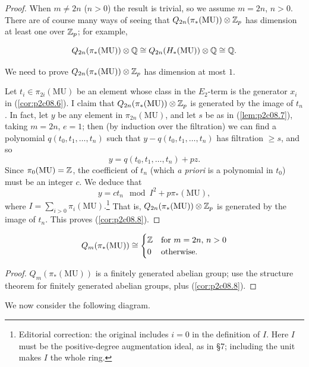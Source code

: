 \documentclass[../main]{subfiles}
\begin{document}
\begin{proof}
When $m \ne 2n$ ($n > 0$) the result is trivial, so we assume $m = 2n$, $n > 0$. There are of course many ways of seeing that $Q_{2n}(\pi_\ast(\mathrm{MU})) \otimes \mathbb{Z}_p$ has dimension at least one over $\mathbb{Z}_p$; for example, 

\[Q_{2n}(\pi_\ast(\mathrm{MU})) \otimes \mathbb{Q} \cong Q_{2n}(H_\ast(\mathrm{MU})) \otimes \mathbb{Q} \cong \mathbb{Q}.\]

We need to prove $Q_{2n}(\pi_\ast(\mathrm{MU})) \otimes \mathbb{Z}_p$ has dimension at most $1$.

Let $t_i \in \pi_{2i}(\mathrm{MU})$ be an element whose class in the $E_2$-term is the generator $x_i$ in (\ref{cor:p2c08.6}). I claim that $Q_{2n}(\pi_\ast(\mathrm {MU})) \otimes \mathbb{Z}_p$ is generated by the image of $t_n$. In fact, let $y$ be any element in $\pi_{2n}(\mathrm {MU})$, and let $s$ be as in (\ref{lem:p2c08.7}), taking $m = 2n$, $e = 1$; then (by induction over the filtration) we can find a polynomial $q(t_0, t_1, \ldots, t_n)$ such that $y - q(t_0, t_1, \ldots, t_n)$ has filtration $\ge s$, and so \[y = q(t_0, t_1, \ldots, t_n) + p z.\] Since $\pi_0(\mathrm{MU}) = \mathbb{Z}$, the coefficient of $t_n$ (which \emph{a priori} is a polynomial in $t_0$) must be an integer $c$. We deduce that \[y = c t_n \mod I^2 + p \pi_\ast(\mathrm{MU}),\] where $\displaystyle I = \sum_{i > 0} \pi_i(\mathrm{MU}).$\footnote{Editorial correction: the original includes $i=0$ in the definition of $I$. Here $I$ must be the positive-degree augmentation ideal, as in \S7; including the unit makes $I$ the whole ring.} That is, $Q_{2n}(\pi_\ast(\mathrm{MU})) \otimes \mathbb{Z}_p$ is generated by the image of $t_n$. This proves (\ref{cor:p2c08.8}).
\end{proof}

\begin{corollary}
\label{cor:p2c08.9}
\[Q_m(\pi_\ast(\mathrm{MU})) \cong \begin{cases}\mathbb{Z} & \text {for } m = 2n, \, n > 0 \\ 0 & \text{otherwise.}\end{cases}\]
\end{corollary}

\begin{proof}
$Q_m(\pi_\ast(\mathrm{MU}))$ is a finitely generated abelian group; use the structure theorem for finitely generated abelian groups, plus (\ref{cor:p2c08.8}).
\end{proof}

We now consider the following diagram. 
\end{document}
